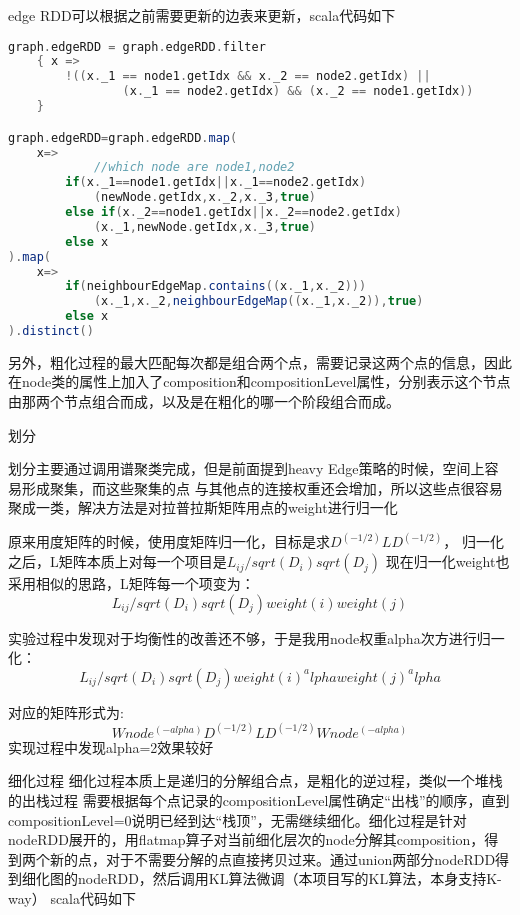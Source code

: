 edge RDD可以根据之前需要更新的边表来更新，scala代码如下

\begin{lstlisting}[language=Scala]
graph.edgeRDD = graph.edgeRDD.filter
    { x =>
        !((x._1 == node1.getIdx && x._2 == node2.getIdx) ||
                (x._1 == node2.getIdx) && (x._2 == node1.getIdx))
    }

graph.edgeRDD=graph.edgeRDD.map(
    x=>
            //which node are node1,node2
        if(x._1==node1.getIdx||x._1==node2.getIdx)
            (newNode.getIdx,x._2,x._3,true)
        else if(x._2==node1.getIdx||x._2==node2.getIdx)
            (x._1,newNode.getIdx,x._3,true)
        else x
).map(
    x=>
        if(neighbourEdgeMap.contains((x._1,x._2)))
            (x._1,x._2,neighbourEdgeMap((x._1,x._2)),true)
        else x
).distinct()

\end{lstlisting}

另外，粗化过程的最大匹配每次都是组合两个点，需要记录这两个点的信息，因此在node类的属性上加入了composition和compositionLevel属性，分别表示这个节点由那两个节点组合而成，以及是在粗化的哪一个阶段组合而成。

划分

划分主要通过调用谱聚类完成，但是前面提到heavy Edge策略的时候，空间上容易形成聚集，而这些聚集的点
与其他点的连接权重还会增加，所以这些点很容易聚成一类，解决方法是对拉普拉斯矩阵用点的weight进行归一化

原来用度矩阵的时候，使用度矩阵归一化，目标是求$D^(-1/2)LD^(-1/2)$，
归一化之后，L矩阵本质上对每一个项目是$L_{ij}/sqrt(D_i)sqrt(D_j)$
现在归一化weight也采用相似的思路，L矩阵每一个项变为：
$$L_{ij}/sqrt(D_i)sqrt(D_j)weight(i)weight(j)$$

实验过程中发现对于均衡性的改善还不够，于是我用node权重alpha次方进行归一化：
$$L_{ij}/sqrt(D_i)sqrt(D_j)weight(i)^alpha weight(j)^alpha$$

对应的矩阵形式为:
$$Wnode^(-alpha)D^(-1/2)LD^(-1/2)Wnode^(-alpha)$$
实现过程中发现alpha=2效果较好

细化过程
细化过程本质上是递归的分解组合点，是粗化的逆过程，类似一个堆栈的出栈过程
需要根据每个点记录的compositionLevel属性确定“出栈”的顺序，直到compositionLevel=0说明已经到达“栈顶”，无需继续细化。细化过程是针对nodeRDD展开的，用flatmap算子对当前细化层次的node分解其composition，得到两个新的点，对于不需要分解的点直接拷贝过来。通过union两部分nodeRDD得到细化图的nodeRDD，然后调用KL算法微调（本项目写的KL算法，本身支持K-way）
scala代码如下

